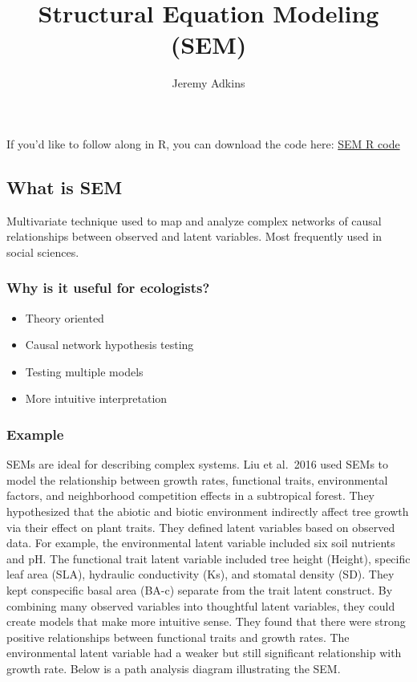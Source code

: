 \documentclass[
]{article}
\title{Structural Equation Modeling (SEM)}
\author{Jeremy Adkins}
\date{}
\providecommand{\tightlist}{%
  \setlength{\itemsep}{0pt}\setlength{\parskip}{0pt}}
\begin{document}
\maketitle

If you'd like to follow along in R, you can download the code here:
\href{Adkins.SEM.R}{SEM R code}

\hypertarget{what-is-sem}{%
\subsection{What is SEM}\label{what-is-sem}}

Multivariate technique used to map and analyze complex networks of
causal relationships between observed and latent variables. Most
frequently used in social sciences.

\hypertarget{why-is-it-useful-for-ecologists}{%
\subsubsection{Why is it useful for
ecologists?}\label{why-is-it-useful-for-ecologists}}

\begin{itemize}
\tightlist
\item
  Theory oriented
\item
  Causal network hypothesis testing
\item
  Testing multiple models
\item
  More intuitive interpretation
\end{itemize}

\hypertarget{example}{%
\subsubsection{Example}\label{example}}

SEMs are ideal for describing complex systems. Liu et al.~2016 used SEMs
to model the relationship between growth rates, functional traits,
environmental factors, and neighborhood competition effects in a
subtropical forest. They hypothesized that the abiotic and biotic
environment indirectly affect tree growth via their effect on plant
traits. They defined latent variables based on observed data. For
example, the environmental latent variable included six soil nutrients
and pH. The functional trait latent variable included tree height
(Height), specific leaf area (SLA), hydraulic conductivity (Ks), and
stomatal density (SD). They kept conspecific basal area (BA-c) separate
from the trait latent construct. By combining many observed variables
into thoughtful latent variables, they could create models that make
more intuitive sense. They found that there were strong positive
relationships between functional traits and growth rates. The
environmental latent variable had a weaker but still significant
relationship with growth rate. Below is a path analysis diagram
illustrating the SEM.
\end{document}
